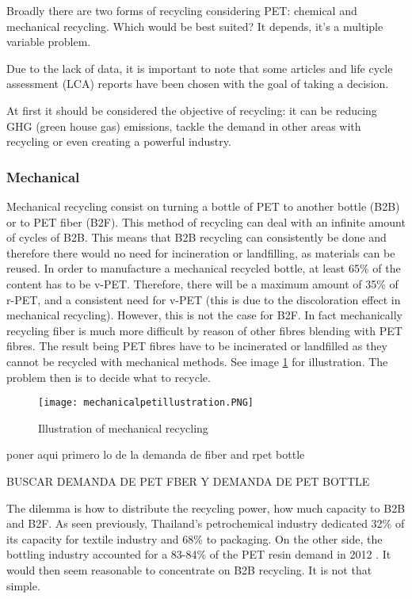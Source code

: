 \documentclass[twoside,a4paper,12pt]{report}
\begin{document}
Broadly there are two forms of recycling considering PET: chemical and mechanical recycling. Which would be best suited? It depends, it's a multiple variable problem.

Due to the lack of data, it is important to note that some articles and life cycle assessment (LCA) reports have been chosen with the goal of taking a decision.

At first it should be considered the objective of recycling: it can be reducing GHG (green house gas) emissions, tackle the demand in other areas with recycling or even creating a powerful industry.

\subsubsection{Mechanical}

Mechanical recycling consist on turning a bottle of PET to another bottle (B2B) or to PET fiber (B2F). This method of recycling can deal with an infinite amount of cycles of B2B. This means that B2B recycling can consistently be done and therefore there would no need for incineration or landfilling, as materials can be reused. In order to manufacture a mechanical recycled bottle, at least 65\% \cite{Nakatani2010} of the content has to be v-PET. Therefore, there will be a maximum amount of 35\% of r-PET, and a consistent need for v-PET (this is due to the discoloration effect in mechanical recycling). However, this is not the case for B2F. In fact mechanically recycling fiber is much more difficult by reason of other fibres blending with PET fibres. The result being PET fibres have to be incinerated or landfilled as they cannot be recycled with mechanical methods. See image \ref{illusmeharecycing} for illustration. The problem then is to decide what to recycle.

\begin{figure}
    \centering
    \texttt{[image: mechanicalpetillustration.PNG]}
    \caption{Illustration of mechanical recycling}
     \label{illusmeharecycing} 
\end{figure}
poner aqui primero lo de la demanda de fiber and rpet bottle 

BUSCAR DEMANDA DE PET FBER Y DEMANDA DE PET BOTTLE

The dilemma is how to distribute the recycling power, how much capacity to B2B and B2F. As seen previously, Thailand's petrochemical industry  dedicated 32\% of its capacity for textile industry and 68\% to packaging. On the other side, the bottling industry accounted for a 83-84\% of the PET resin demand in 2012 \cite{Wen2014}. It would then seem reasonable to concentrate on B2B recycling. It is not that simple.
\end{document}
